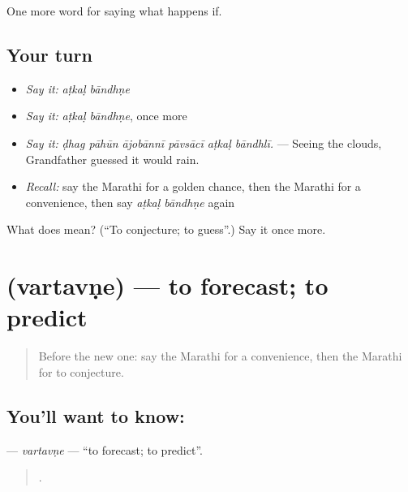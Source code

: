 \begin{grammarlens}[title={What you've built}]
One more word for saying what happens if.
\end{grammarlens}

\subsection*{Your turn}
\begin{itemize}
\raggedright
  \item \emph{Say it:} \emph{aṭkaḷ bāndhṇe}
  \item \emph{Say it:} \emph{aṭkaḷ bāndhṇe}, once more
  \item \emph{Say it:} \emph{ḍhag pāhūn ājobānnī pāvsācī aṭkaḷ bāndhlī.} — Seeing the clouds, Grandfather guessed it would rain.
  \item \emph{Recall:} say the Marathi for a golden chance, then the Marathi for a convenience, then say \emph{aṭkaḷ bāndhṇe} again
\end{itemize}

\begin{tcolorbox}[breakable,colback=teal!4,colframe=teal!35!black,title={Before you move on}]
What does   mean? (\textquotedblleft{}To conjecture; to guess\textquotedblright{}.) Say it once more.
\end{tcolorbox}
\section[\texorpdfstring{\mr{वर्तवणे} (vartavṇe)}{वर्तवणे (vartavṇe)}]{ (vartavṇe) — to forecast; to predict}

\label{lesson:MR-C545-vartavne}



\begin{quote}
Before the new one: say the Marathi for a convenience, then the Marathi for to conjecture.
\end{quote}

\subsection*{You'll want to know: }
\textbf{} — \emph{vartavṇe} — \textquotedblleft{}to forecast; to predict\textquotedblright{}.

\begin{quote}
     .
\end{quote}

